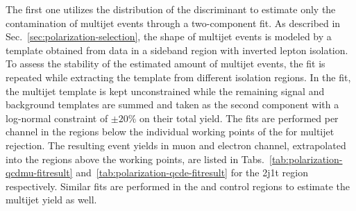 The first one utilizes the distribution of the \bdtqcd discriminant to estimate only the contamination of multijet events through a two-component fit. As described in Sec.~\ref{sec:polarization-selection}, the shape of multijet events is modeled by a template obtained from data in a sideband region with inverted lepton isolation. To assess the stability of the estimated amount of multijet events, the fit is repeated while extracting the template from different isolation regions. In the fit, the multijet template is kept unconstrained while the remaining signal and background templates are summed and taken as the second component with a log-normal constraint of $\pm20\%$ on their total yield. The fits are performed per channel in the regions below the individual working points of the \bdtqcd for multijet rejection. The resulting event yields in muon and electron channel, extrapolated into the regions above the working points, are listed in Tabs.~\ref{tab:polarization-qcdmu-fitresult} and~\ref{tab:polarization-qcde-fitresult} for the 2j1t region respectively. Similar fits are performed in the \wjets and \ttbar control regions to estimate the multijet yield as well.



